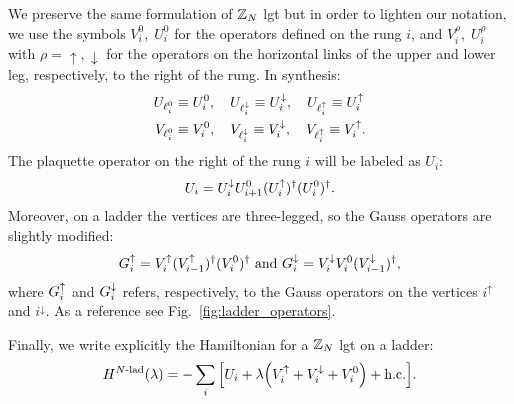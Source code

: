 We preserve the same formulation of $\mathbb{Z}_N$ \ac{lgt} but in order to lighten our notation,
we use the symbols $V^0_i, \; U^0_i$ for the operators defined on the rung $i$, and  $V^{\rho}_i, \; U^{\rho}_i$ with $\rho = \uparrow, \downarrow$ for the operators on the horizontal links of the upper and lower leg, respectively, to the right of the rung.
In synthesis:
\begin{equation}
    \begin{split}
        U_{\ell^0_i} & \equiv U^0_i, \quad
        U_{\ell^\downarrow_i}   \equiv U^{\downarrow}_i, \quad
        U_{\ell^\uparrow_i}   \equiv U^{\uparrow}_i \\
        V_{\ell^0_i} & \equiv V^0_i, \quad
        V_{\ell^\downarrow_i}   \equiv V^{\downarrow}_i, \quad
        V_{\ell^\uparrow_i}   \equiv V^{\uparrow}_i.
    \end{split}
\end{equation}
The plaquette operator on the right of the rung $i$ will be labeled as $U_i$:
\begin{equation}
    U_i = U^{\downarrow}_i U^0_{i+1} (U^{\uparrow}_i)^{\dagger} (U^0_i)^{\dagger}.
    \label{eq:plaq_op_ladder}
\end{equation}
Moreover, on a ladder the vertices are three-legged, so the Gauss operators are slightly modified:
\begin{equation}
    G^{\uparrow}_i
    = V^{\uparrow}_i ( V^{\uparrow}_{i-1} )^\dagger ( V^0_i )^\dagger \text{~and~}
    G^{\downarrow}_i
    = V^{\downarrow}_i V^0_i ( V^{\downarrow}_{i-1} )^\dagger,
    \label{eq:gauss_law_ladder}
\end{equation}
where $G^{\uparrow}_i$ and $G^{\downarrow}_i$ refers, respectively, to the Gauss operators on the vertices $i^{\uparrow}$ and $i^{\downarrow}$.
As a reference see Fig.~\ref{fig:ladder_operators}.

Finally, we write explicitly the Hamiltonian for a $\mathbb{Z}_N$ \ac{lgt} on a ladder:
\begin{equation}
    \HamilLadder(\lambda) =
    - \sum_{i} \bqty{ U_i + \lambda \pqty{ \Vup_i + \Vdown_i + V^0_i } + \text{h.c.} }.
    \label{eq:ladder_hamiltonian}
\end{equation}



